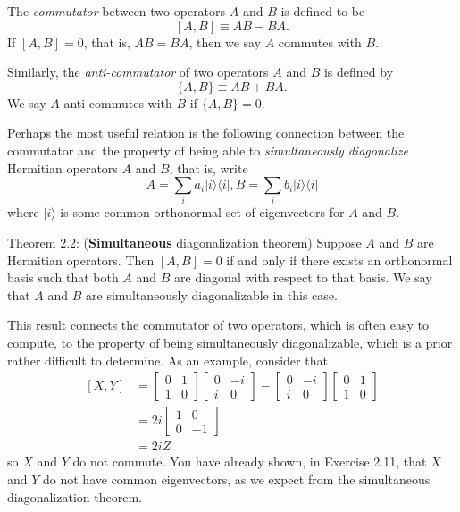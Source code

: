 The \textit{commutator} between two operators $A$ and $B$ is defined to be
$$
[A, B] \equiv A B-B A.
$$
If $[A, B]=0$, that is, $A B=B A$, then we say $A$ commutes with $B$. 

Similarly, the \textit{anti-commutator} of two operators $A$ and $B$ is defined by
$$
\{A, B\} \equiv A B+B A.
$$
We say $A$ anti-commutes with $B$ if $\{A, B\}=0$. 


Perhaps the most useful relation is the following connection between the commutator and the property of being able to \textit{simultaneously diagonalize} Hermitian operators $A$ and $B$, that is, write 
$$
A=\sum_{i} a_{i}|i\rangle\langle i|, B=\sum_{i} b_{i}| i\rangle\langle i|
$$
where $|i\rangle$ is some common orthonormal set of eigenvectors for $A$ and $B$.

\begin{theorem}
    Theorem 2.2: (\textbf{Simultaneous} diagonalization theorem) Suppose $A$ and $B$ are Hermitian operators. Then $[A, B]=0$ if and only if there exists an orthonormal basis such that both $A$ and $B$ are diagonal with respect to that basis. We say that $A$ and $B$ are simultaneously diagonalizable in this case.
\end{theorem}

This result connects the commutator of two operators, which is often easy to compute, to the property of being simultaneously diagonalizable, which is a prior rather difficult to determine. As an example, consider that
$$
\begin{aligned}
{[X, Y] } & =\left[\begin{array}{ll}
0 & 1 \\
1 & 0
\end{array}\right]\left[\begin{array}{rr}
0 & -i \\
i & 0
\end{array}\right]-\left[\begin{array}{rr}
0 & -i \\
i & 0
\end{array}\right]\left[\begin{array}{ll}
0 & 1 \\
1 & 0
\end{array}\right] \\
& =2 i\left[\begin{array}{rr}
1 & 0 \\
0 & -1
\end{array}\right] \\
& =2 i Z
\end{aligned}
$$
so $X$ and $Y$ do not commute. You have already shown, in Exercise 2.11, that $X$ and $Y$ do not have common eigenvectors, as we expect from the simultaneous diagonalization theorem.

